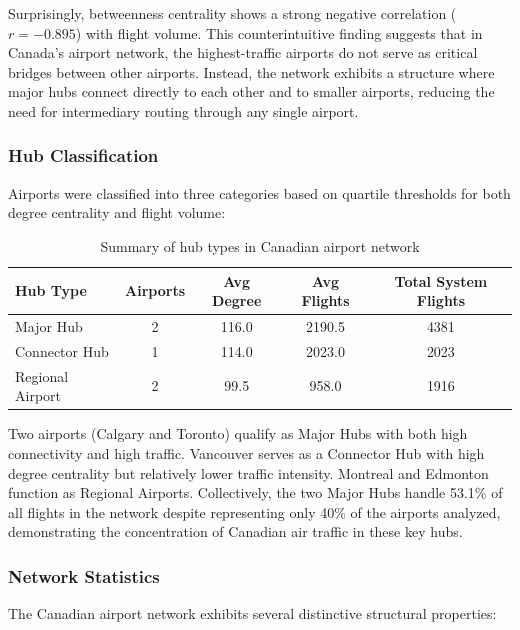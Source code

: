 \documentclass[9pt]{article}
\begin{document}
Surprisingly, betweenness centrality shows a strong negative correlation ($r = -0.895$) with flight volume. This counterintuitive finding suggests that in Canada's airport network, the highest-traffic airports do not serve as critical bridges between other airports. Instead, the network exhibits a structure where major hubs connect directly to each other and to smaller airports, reducing the need for intermediary routing through any single airport.

\subsubsection{Hub Classification}

Airports were classified into three categories based on quartile thresholds for both degree centrality and flight volume:

\begin{table}[h!]
    \centering
    \caption{Summary of hub types in Canadian airport network}
    \begin{tabular}{lcccc}
        \toprule
        Hub Type & Airports & Avg Degree & Avg Flights & Total System Flights \\
        \midrule
        Major Hub        & 2 & 116.0 & 2190.5 & 4381 \\
        Connector Hub    & 1 & 114.0 & 2023.0 & 2023 \\
        Regional Airport & 2 & 99.5  & 958.0  & 1916 \\
        \bottomrule
    \end{tabular}
\end{table}

Two airports (Calgary and Toronto) qualify as Major Hubs with both high connectivity and high traffic. Vancouver serves as a Connector Hub with high degree centrality but relatively lower traffic intensity. Montreal and Edmonton function as Regional Airports. Collectively, the two Major Hubs handle 53.1\% of all flights in the network despite representing only 40\% of the airports analyzed, demonstrating the concentration of Canadian air traffic in these key hubs.

\subsubsection{Network Statistics}

The Canadian airport network exhibits several distinctive structural properties:
\end{document}
